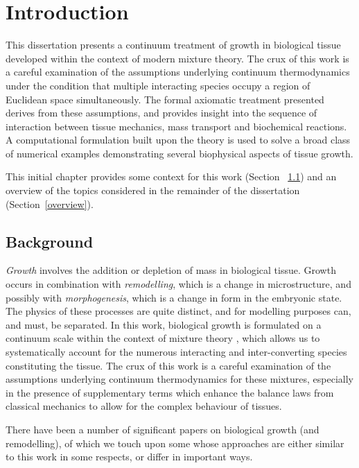\chapter{Introduction}
\label{introduction}

This dissertation presents a continuum treatment of growth in
biological tissue developed within the context of modern mixture
theory. The crux of this work is a careful examination of the
assumptions underlying continuum thermodynamics under the condition
that multiple interacting species occupy a region of Euclidean space
simultaneously. The formal axiomatic treatment presented derives from
these assumptions, and provides insight into the sequence of
interaction between tissue mechanics, mass transport and biochemical
reactions. A computational formulation built upon the theory is used
to solve a broad class of numerical examples demonstrating several
biophysical aspects of tissue growth.

This initial chapter provides some context for this work (Section%
~\ref{background}) and an overview of the topics considered in the
remainder of the dissertation (Section~\ref{overview}).

\section{Background}
\label{background}

\emph{Growth} involves the addition or depletion of mass in biological
tissue. Growth occurs in combination with \emph{remodelling}, which is
a change in microstructure, and possibly with \emph{morphogenesis},
which is a change in form in the embryonic state. The physics of these
processes are quite distinct, and for modelling purposes can, and
must, be separated. In this work, biological growth is formulated on a
continuum scale within the context of mixture theory
\citep{TruesdellToupin:60, TruesdellNoll:65, BedfordDrumheller:1983},
which allows us to systematically account for the numerous interacting
and inter-converting species constituting the tissue. The crux of this
work is a careful examination of the assumptions underlying continuum
thermodynamics for these mixtures, especially in the presence of
supplementary terms which enhance the balance laws from classical
mechanics to allow for the complex behaviour of tissues.

There have been a number of significant papers on biological growth
(and remodelling), of which we touch upon some whose approaches are
either similar to this work in some respects, or differ in important
ways.

